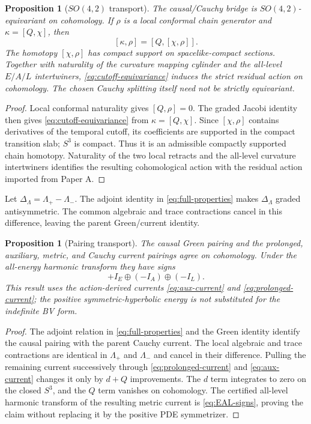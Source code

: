 \documentclass[11pt]{article}
\newtheorem{proposition}[theorem]{Proposition}
\theoremstyle{definition}
\theoremstyle{remark}
\begin{document}
\begin{proposition}[$SO(4,2)$ transport]\label{prop:SO42}
The causal/Cauchy bridge is $SO(4,2)$-equivariant on cohomology.  If $\rho$
is a local conformal chain generator and $\kappa=[Q,\chi]$, then
\begin{equation}\label{eq:cutoff-equivariance}
 [\kappa,\rho]=[Q,[\chi,\rho]].
\end{equation}
The homotopy $[\chi,\rho]$ has compact support on spacelike-compact sections.
Together with naturality of the curvature mapping cylinder and the all-level
$E/A/L$ intertwiners, \eqref{eq:cutoff-equivariance} induces the strict
residual action on cohomology.  The chosen Cauchy splitting itself need not
be strictly equivariant.
\end{proposition}

\begin{proof}
Local conformal naturality gives $[Q,\rho]=0$.  The graded Jacobi identity
then gives \eqref{eq:cutoff-equivariance} from $\kappa=[Q,\chi]$.  Since
$[\chi,\rho]$ contains derivatives of the temporal cutoff, its coefficients
are supported in the compact transition slab; $S^3$ is compact.  Thus it is
an admissible compactly supported chain homotopy.  Naturality of the two
local retracts and the all-level curvature intertwiners identifies the
resulting cohomological action with the residual action imported from Paper
A.
\end{proof}

Let $\Delta_\Lambda=\Lambda_+-\Lambda_-$.  The adjoint identity in
\eqref{eq:full-properties} makes $\Delta_\Lambda$ graded antisymmetric.  The
common algebraic and trace contractions cancel in this difference, leaving
the parent Green/current identity.

\begin{proposition}[Pairing transport]\label{prop:pairing}
The causal Green pairing and the prolonged, auxiliary, metric, and Cauchy
current pairings agree on cohomology.  Under the all-energy harmonic
transform they have signs
\begin{equation}\label{eq:EAL-signs}
 +I_E\oplus(-I_A)\oplus(-I_L).
\end{equation}
This result uses the action-derived currents
\eqref{eq:aux-current} and \eqref{eq:prolonged-current}; the positive
symmetric-hyperbolic energy is not substituted for the indefinite BV form.
\end{proposition}

\begin{proof}
The adjoint relation in \eqref{eq:full-properties} and the Green identity
identify the causal pairing with the parent Cauchy current.  The local
algebraic and trace contractions are identical in $\Lambda_+$ and
$\Lambda_-$ and cancel in their difference.  Pulling the remaining current
successively through \eqref{eq:prolonged-current} and
\eqref{eq:aux-current} changes it only by $d+Q$ improvements.  The $d$ term
integrates to zero on the closed $S^3$, and the $Q$ term vanishes on
cohomology.  The certified all-level harmonic transform of the resulting
metric current is \eqref{eq:EAL-signs}, proving the claim without replacing
it by the positive PDE symmetrizer.
\end{proof}
\end{document}
